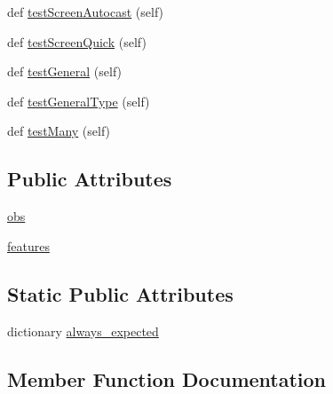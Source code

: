 \begin{DoxyCompactItemize}
\item 
def \mbox{\hyperlink{classpysc2_1_1lib_1_1features__test_1_1_available_actions_test_aa45dcbb1016274aeeed4205e52fbd929}{test\+Screen\+Autocast}} (self)
\item 
def \mbox{\hyperlink{classpysc2_1_1lib_1_1features__test_1_1_available_actions_test_a553d3edfd2942d466b6ba94f4c4e0deb}{test\+Screen\+Quick}} (self)
\item 
def \mbox{\hyperlink{classpysc2_1_1lib_1_1features__test_1_1_available_actions_test_ad6f0fbdcb2d4c10d1a78cfbbaf5035cd}{test\+General}} (self)
\item 
def \mbox{\hyperlink{classpysc2_1_1lib_1_1features__test_1_1_available_actions_test_a46f45bb4380146cc1b12ee89ecd7f784}{test\+General\+Type}} (self)
\item 
def \mbox{\hyperlink{classpysc2_1_1lib_1_1features__test_1_1_available_actions_test_a6c75f62739b0fda29d141508915d19f1}{test\+Many}} (self)
\end{DoxyCompactItemize}
\subsection*{Public Attributes}
\begin{DoxyCompactItemize}
\item 
\mbox{\hyperlink{classpysc2_1_1lib_1_1features__test_1_1_available_actions_test_a278a84d8d5a7f838888362ac5155c6de}{obs}}
\item 
\mbox{\hyperlink{classpysc2_1_1lib_1_1features__test_1_1_available_actions_test_a7bd625dacb0c1f3e691871778b8ba432}{features}}
\end{DoxyCompactItemize}
\subsection*{Static Public Attributes}
\begin{DoxyCompactItemize}
\item 
dictionary \mbox{\hyperlink{classpysc2_1_1lib_1_1features__test_1_1_available_actions_test_a55cbd4d16deaac1b6dfd09667bcf5644}{always\+\_\+expected}}
\end{DoxyCompactItemize}


\subsection{Member Function Documentation}
\mbox{\label{classpysc2_1_1lib_1_1features__test_1_1_available_actions_test_af4d9c7bad6bec5202f096d73cfc641b3}} 
